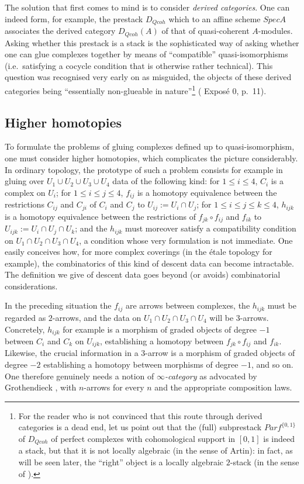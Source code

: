 The solution that first comes to mind is to consider \emph{derived
categories}. One can indeed form, for example, the prestack $D_{Qcoh}$ which
to an affine scheme $Spec A$ associates the derived category $D_{Qcoh}(A)$ of
that of quasi-coherent $A$-modules. Asking whether this prestack is a stack
is the sophisticated way of asking whether one can glue complexes together by
means of ``compatible'' quasi-isomorphisms (i.e.\ satisfying a cocycle
condition that is otherwise rather technical). This question was recognised
very early on as misguided, the objects of these derived categories being
``essentially non-glueable in nature''\footnote{For the reader who is not
convinced that this route through derived categories is a dead end, let us
point out that the (full) subprestack $Parf^{\{0,1\}}$ of $D_{Qcoh}$ of
perfect complexes with cohomological support in $[0,1]$ is indeed a stack, but
that it is not locally algebraic (in the sense of Artin): in fact, as will be
seen later, the ``right'' object is a locally algebraic $2$-stack (in the
sense of \cite{geometricN}).} (\cite{SGA6} Exposé 0, p.~11).

\subsection*{Higher homotopies}

To formulate the problems of gluing complexes defined up to
quasi-isomorphism, one must consider higher homotopies, which complicates the
picture considerably. In ordinary topology, the prototype of such a problem
consists for example in gluing over $U_1 \cup U_2 \cup U_3 \cup U_4$ data of
the following kind: for $1 \leq i\leq 4$, $C_i$ is a complex on $U_i$; for
$1 \leq i\leq j \leq 4$, $f_{ij}$ is a homotopy equivalence between the
restrictions $C_{ij}$ and $C_{ji}$ of $C_i$ and $C_j$ to
$U_{ij}:=U_i \cap U_j$; for $1 \leq i\leq j \leq k\leq 4$, $h_{ijk}$ is a
homotopy equivalence between the restrictions of $f_{jk}\circ f_{ij}$ and
$f_{ik}$ to $U_{ijk}:=U_i \cap U_j \cap U_k$; and the $h_{ijk}$ must
moreover satisfy a compatibility condition on $U_1 \cap U_2 \cap U_3 \cap
U_4$, a condition whose very formulation is not immediate. One easily
conceives how, for more complex coverings (in the étale topology for
example), the combinatorics of this kind of descent data can become
intractable. The definition we give of descent data goes beyond (or avoids)
combinatorial considerations.

In the preceding situation the $f_{ij}$ are arrows between complexes, the
$h_{ijk}$ must be regarded as $2$-arrows, and the data on $U_1 \cap U_2 \cap
U_3 \cap U_4$ will be $3$-arrows. Concretely, $h_{ijk}$ for example is a
morphism of graded objects of degree $-1$ between $C_i$ and $C_k$ on
$U_{ijk}$, establishing a homotopy between $f_{jk}\circ f_{ij}$ and $f_{ik}$.
Likewise, the crucial information in a $3$-arrow is a morphism of graded
objects of degree $-2$ establishing a homotopy between morphisms of degree
$-1$, and so on. One therefore genuinely needs a notion of
\emph{$\infty$-category} as advocated by Grothendieck \cite{Grothendieck},
with $n$-arrows for every $n$ and the appropriate composition laws.

